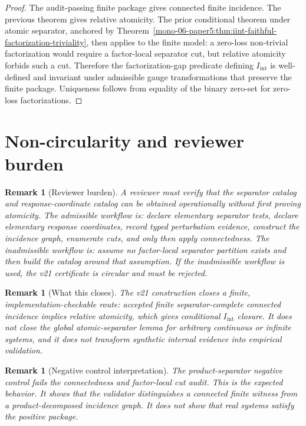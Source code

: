 \documentclass[11pt]{article}
\newtheorem{remark}[definition]{Remark}
\newcommand{\Iint}{I_{\mathrm{int}}}
\begin{document}
\begin{proof}
The audit-passing finite package gives connected finite incidence. The previous theorem gives relative atomicity. The prior conditional theorem under atomic separator, anchored by Theorem~\ref{mono-06-paper5:thm:iint-faithful-factorization-triviality}, then applies to the finite model: a zero-loss non-trivial factorization would require a factor-local separator cut, but relative atomicity forbids such a cut. Therefore the factorization-gap predicate defining $\Iint$ is well-defined and invariant under admissible gauge transformations that preserve the finite package. Uniqueness follows from equality of the binary zero-set for zero-loss factorizations.
\end{proof}

\section{Non-circularity and reviewer burden}

\begin{remark}[Reviewer burden]
A reviewer must verify that the separator catalog and response-coordinate catalog can be obtained operationally without first proving atomicity. The admissible workflow is: declare elementary separator tests, declare elementary response coordinates, record typed perturbation evidence, construct the incidence graph, enumerate cuts, and only then apply connectedness. The inadmissible workflow is: assume no factor-local separator partition exists and then build the catalog around that assumption. If the inadmissible workflow is used, the v21 certificate is circular and must be rejected.
\end{remark}

\begin{remark}[What this closes]
The v21 construction closes a finite, implementation-checkable route: accepted finite separator-complete connected incidence implies relative atomicity, which gives conditional $\Iint$ closure. It does not close the global atomic-separator lemma for arbitrary continuous or infinite systems, and it does not transform synthetic internal evidence into empirical validation.
\end{remark}

\begin{remark}[Negative control interpretation]
The product-separator negative control fails the connectedness and factor-local cut audit. This is the expected behavior. It shows that the validator distinguishes a connected finite witness from a product-decomposed incidence graph. It does not show that real systems satisfy the positive package.
\end{remark}
\end{document}
